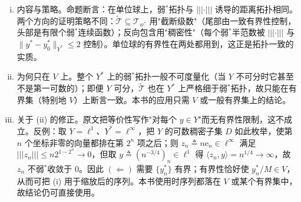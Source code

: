 \documentclass[../main.tex]{subfiles}
\begin{document}
\begin{remark}\label{remark:appA-弱星可度量化}
\begin{enumerate}[(i)]
\item 内容与策略。命题断言：在单位球上，弱$^*$拓扑与 $|||\cdot|||$ 诱导的距离拓扑相同。两个方向的证明策略不同：$\widetilde{\mathscr{T}}\subseteq\mathscr{T}_{w^*}$ 用"截断级数"（尾部由一致有界性控制，头部是有限个弱$^*$连续函数）；反向包含用"稠密性"（每个弱$^*$半范数被 $|||\cdot|||$ 与 $\|y^*-y_0^*\|_{Y^*}\leqslant2$ 控制）。单位球的有界性在两处都用到，这正是拓扑一致的实质。
\item 为何只在 $V$ 上。整个 $Y^*$ 上的弱$^*$拓扑一般不可度量化（当 $Y$ 不可分时它甚至不是第一可数的）；即便 $Y$ 可分，$\widetilde{\mathscr{T}}$ 也在 $Y^*$ 上严格细于弱$^*$拓扑，故只能在有界集（特别地 $V$）上断言一致。本书的应用只需 $V$ 或一般有界集上的结论。
\item 关于 (ii) 的修正。原文把等价性写作"对每个 $y\in Y$"而无有界性限制，这不成立。反例：取 $Y=\ell^1$、$Y^*=\ell^\infty$，把 $Y$ 的可数稠密子集 $D$ 如此枚举，使第 $n$ 个坐标非零的向量都排在第 $2^n$ 项之后；则 $z_n\triangleq n\mathrm{e}_n\in\ell^\infty$ 满足 $|||z_n|||\leqslant n2^{1-2^n}\to0$，但取 $y\triangleq(n^{-3/4})_{n}\in\ell^1$ 得 $\langle z_n,y\rangle=n^{1/4}\to\infty$，故 $z_n$ 不弱$^*$收敛于 $0$。因此 $(\Leftarrow)$ 需要 $\{y_n^*\}$ 有界；有界性恰好使 $y_n^*/M\in V$，从而可把 (i) 用于缩放后的序列。本书使用时序列都落在 $V$ 或某个有界集中，故结论仍可直接使用。
\end{enumerate}
\end{remark}
\end{document}

